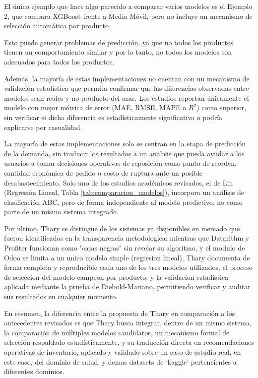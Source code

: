 El único ejemplo que hace algo parecido a comparar varios modelos es el Ejemplo 2, que compara XGBoost frente a Media Móvil, pero no incluye un mecanismo de selección automática por producto.

Esto puede generar problemas de predicción, ya que no todos los productos tienen un comportamiento similar y por lo tanto, no todos los modelos son adecuados para todos los productos. 

Además, la mayoría de estas implementaciones no cuentan con un mecanismo de validación estadística que permita confirmar que las diferencias observadas entre modelos sean reales y no producto del azar. Los estudios reportan únicamente el modelo con mejor métrica de error (MAE, RMSE, MAPE o $R^2$) como superior, sin verificar si dicha diferencia es estadísticamente significativa o podría explicarse por casualidad.

La mayoría de estas implementaciones solo se centran en la etapa de predicción de la demanda, sin traducir los resultados a un análisis que pueda ayudar a los usuarios a tomar decisiones operativas de reposición como punto de reorden, cantidad económica de pedido o costo de ruptura ante un posible desabastecimiento. Solo uno de los estudios académicos revisados, el de Lin \cite{lin2024abc} (Regresión Lineal, Tabla \ref{tab:comparacion_modelos}), incorpora un análisis de clasificación ABC, pero de forma independiente al modelo predictivo, no como parte de un mismo sistema integrado.

Por ultimo, Thary se distingue de los sistemas ya disponibles en mercado que fueron identificados en la transparencia metodologica: mientras que Datarithm y Profiter funcionan como "cajas negras" sin revelar su algoritmo, y el modulo de Odoo se limita a un unico modelo simple (regresion lineal), Thary documenta de forma completa y reproducible cada uno de los tres modelos utilizados, el proceso de seleccion del modelo campeon por producto, y la validacion estadistica aplicada mediante la prueba de Diebold-Mariano, permitiendo verificar y auditar sus resultados en cualquier momento.

En resumen, la diferencia entre la propuesta de Thary en comparación a los antecedentes revisados es que Thary busca integrar, dentro de un mismo sistema, la comparación de múltiples modelos candidatos, un mecanismo formal de selección respaldado estadísticamente, y su traducción directa en recomendaciones operativas de inventario, aplicado y validado sobre un caso de estudio real, en este caso, del dominio de salud, y demas datasets de 'kaggle' pertencientes a diferentes dominios.

